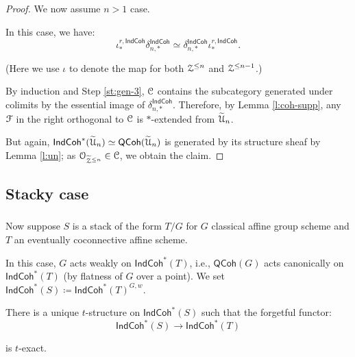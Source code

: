\documentclass[reqno,11pt]{amsart}
\numberwithin{equation}{subsection}
\theoremstyle{remark}
\newcommand{\sC}{{\EuScript C}}
\newcommand{\sF}{{\EuScript F}}
\newcommand{\sO}{{\EuScript O}}
\newcommand{\sU}{{\EuScript U}}
\newcommand{\sZ}{{\EuScript Z}}
\newcommand{\Coh}{\mathsf{Coh}}
\newcommand{\IndCoh}{\mathsf{IndCoh}}
\newcommand{\QCoh}{\mathsf{QCoh}}
\renewcommand{\subset}{\subseteq}
\begin{document}
\begin{proof}
\step 

We now assume $n>1$ case. 

In this case, we have:
%
\[
\iota_*^{r,\IndCoh}\delta_{n,*}^{\IndCoh} \simeq 
\delta_{n,*}^{\IndCoh}
\iota_*^{r,\IndCoh}.
\]

\noindent (Here we use $\iota$ to denote the map for both $\sZ^{\leq n}$ 
and $\sZ^{\leq n-1}$.)

By induction and Step \ref{st:gen-3}, $\sC$ contains the subcategory
generated under colimits by the essential image of
$\delta_{n,*}^{\IndCoh}$. Therefore, by Lemma \ref{l:coh-supp}, 
any $\sF$ in the right orthogonal to $\sC$ is $*$-extended
from $\widetilde{\sU}_n$. 

But again, $\IndCoh^*(\widetilde{\sU}_n) \simeq \QCoh(\widetilde{\sU}_n)$ is generated
by its structure sheaf by Lemma \ref{l:un}; as 
$\sO_{\widetilde{\sZ}^{\leq n}} \in \sC$, we obtain the claim.

\end{proof}


\subsection{Stacky case}

\subsubsection{}

Now suppose $S$ is a stack of the form $T/G$ for $G$ classical affine group scheme
and $T$ an eventually coconnective affine scheme.

In this case, $G$ acts weakly on $\IndCoh^*(T)$, i.e., $\QCoh(G)$
acts canonically on $\IndCoh^*(T)$ (by flatness of $G$ over a point). 
We set $\IndCoh^*(S) \coloneqq \IndCoh^*(T)^{G,w}$.


There is a unique $t$-structure on $\IndCoh^*(S)$ such that the
forgetful functor:
%
\[
\IndCoh^*(S) \to \IndCoh^*(T)
\]

\noindent is $t$-exact. 
\end{document}
